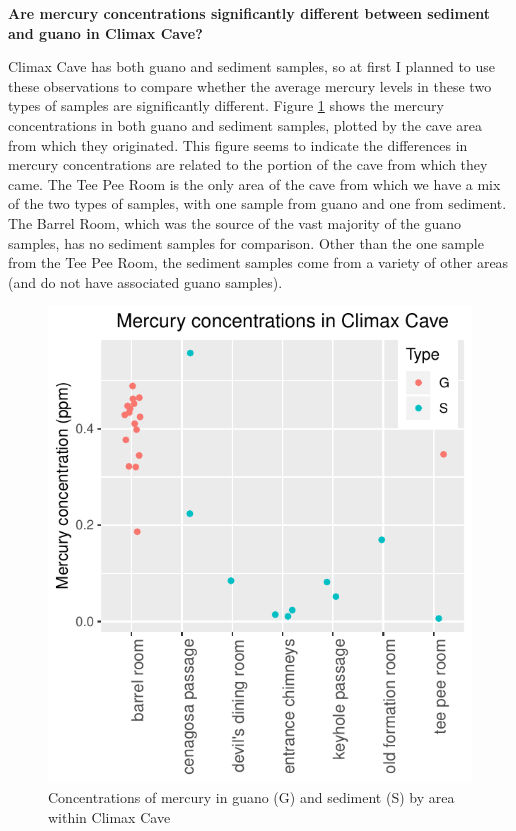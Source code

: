 \documentclass[11pt]{article}
\begin{document}
\noindent \textbf{Are mercury concentrations significantly different
  between sediment and guano in Climax Cave?}

Climax Cave has both guano and sediment samples, so at first I planned
to use these observations to compare whether the average mercury
levels in these two types of samples are significantly different.
Figure \ref{fig:dotplot_climaxcave_by_area} shows the mercury
concentrations in both guano and sediment samples, plotted by the cave
area from which they originated.  This figure seems to indicate the
differences in mercury concentrations are related to the portion of
the cave from which they came.  The Tee Pee Room is the only area of
the cave from which we have a mix of the two types of samples, with
one sample from guano and one from sediment.  The Barrel Room, which
was the source of the vast majority of the guano samples, has no
sediment samples for comparison.  Other than the one sample from the
Tee Pee Room, the sediment samples come from a variety of other areas
(and do not have associated guano samples).
\begin{figure}[hb]
  \centering
  \includegraphics{dotplot_climaxcave_by_area}
  \caption{Concentrations of mercury in guano (G) and sediment (S) by area within Climax Cave}
  \label{fig:dotplot_climaxcave_by_area}
\end{figure}
\end{document}

